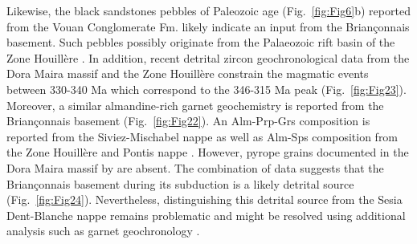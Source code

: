 \documentclass[twoside]{article}
\begin{document}
Likewise, the black sandstones pebbles of Paleozoic age (Fig.~\ref{fig:Fig6}b) reported from the Vouan Conglomerate Fm. likely indicate an input from the Briançonnais basement. Such pebbles possibly originate from the Palaeozoic rift basin of the Zone Houillère \citep{Fabre1961}. In addition, recent detrital zircon geochronological data from the Dora Maira massif and the Zone Houillère \citep{Manzotti2016} constrain the magmatic events between 330-340 Ma which correspond to the 346-315 Ma peak (Fig.~\ref{fig:Fig23}). Moreover, a similar almandine-rich garnet geochemistry is reported from the Briançonnais basement (Fig.~\ref{fig:Fig22}). An Alm-Prp-Grs composition is reported from the Siviez-Mischabel nappe \citep{Thelin1990} as well as Alm-Sps composition from the Zone Houillère \citep{Bucher2007} and Pontis nappe \citep{Giorgis1999}. However, pyrope grains documented in the Dora Maira massif by \citep{Schertl1991} are absent. The combination of data suggests that the Briançonnais basement during its subduction is a likely detrital source (Fig.~\ref{fig:Fig24}). Nevertheless, distinguishing this detrital source from the Sesia Dent-Blanche nappe remains problematic and might be resolved using additional analysis such as garnet geochronology \citep{Baxter2013}.\par
\medskip

\end{document}
